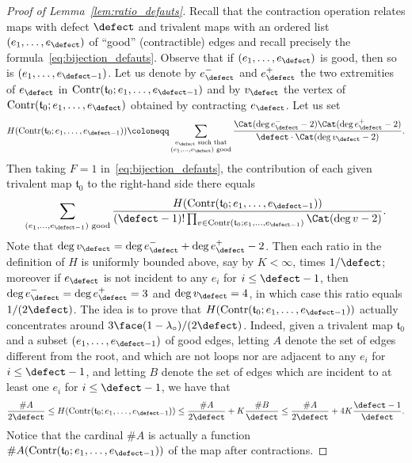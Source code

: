 \begin{proof}[Proof of Lemma~\ref{lem:ratio_defauts}]
Recall that the contraction operation relates maps with defect $\defect$ and trivalent maps with an ordered list $(e_1, \dots, e_\defect)$ of ``good'' (\ie contractible) edges and recall precisely the formula~\eqref{eq:bijection_defauts}.
Observe that if $(e_1, \dots, e_\defect)$ is good, then so is $(e_1, \dots, e_{\defect-1})$. Let us denote by $e_\defect^-$ and $e_\defect^+$ the two extremities of $e_\defect$ in $\mathrm{Contr}(\mathfrak{t}_0 ; e_1, \dots, e_{\defect-1})$ and by $v_\defect$ the vertex of $\mathrm{Contr}(\mathfrak{t}_0 ; e_1, \dots, e_\defect)$ obtained by contracting $e_\defect$.
Let us set
\[
H(\mathrm{Contr}(\mathfrak{t}_0 ; e_1, \dots, e_{ \defect-1}))
\coloneqq \sum_{\substack{e_\defect \text{ such that}\\ (e_1, \dots, e_\defect) \text{ good}}} \frac{\Cat(\deg e_\defect^- - 2) \Cat(\deg e_\defect^+ - 2)}{\defect\cdot\Cat(\deg v_\defect - 2)}.
\]
Then taking $F=1$ in~\eqref{eq:bijection_defauts}, the contribution of each given trivalent map $\mathfrak{t}_0$ to the right-hand side there equals
\[
\sum_{(e_1, \dots, e_{\defect-1}) \text{ good}} \frac{H(\mathrm{Contr}(\mathfrak{t}_0 ; e_1, \dots, e_{ \defect-1}))}{(\defect-1)! \prod_{v \in \mathrm{Contr}(\mathfrak{t}_0 ; e_1, \dots, e_{\defect-1})} \Cat(\deg v - 2)}.
\]
Note that $\deg v_\defect = \deg e_\defect^- + \deg e_\defect^+ - 2$. Then each ratio in the definition of $H$ is uniformly bounded above, say by $K < \infty$, times $1/\defect$; moreover if $e_\defect$ is not incident to any $e_i$ for $i \le \defect-1$, then $\deg e_\defect^- = \deg e_\defect^+ = 3$ and $\deg v_\defect = 4$, in which case this ratio equals $1/(2\defect)$. The idea is to prove that $H(\mathrm{Contr}(\mathfrak{t}_0 ; e_1, \dots, e_{ \defect-1}))$ actually concentrates around $3\face(1-\lambda_\circ) / (2\defect)$. Indeed, given a trivalent map $\mathfrak{t}_0$ and a subset $(e_1, \dots, e_{\defect-1})$ of good edges, letting $A$ denote the set of edges different from the root, and which are not loops nor are adjacent to any $e_i$ for $i \le \defect-1$, and letting $B$ denote the set of edges which are incident to at least one $e_i$ for $i \le \defect-1$,
we have that
\[
\frac{\# A}{2\defect}
\le H(\mathrm{Contr}(\mathfrak{t}_0 ; e_1, \dots, e_{ \defect-1}))
\le \frac{\# A}{2\defect} + K \frac{\# B}{\defect}
\le \frac{\# A}{2\defect} + 4 K \frac{\defect-1}{\defect}.
\]
Notice that the cardinal $\#A$ is actually a function $\#A(\mathrm{Contr}(\mathfrak{t}_0 ; e_1, \dots, e_{ \defect-1}))$ of the map after contractions.

\end{proof}
